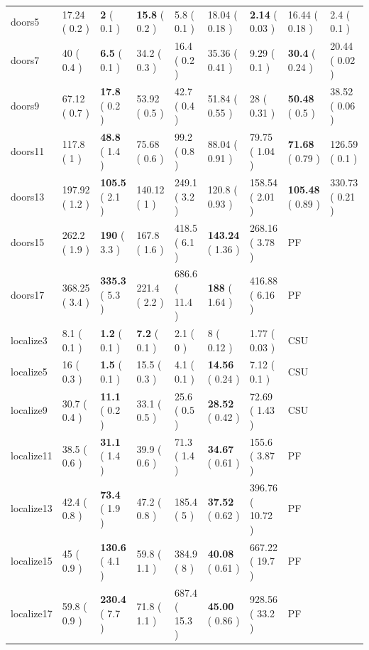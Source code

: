 \documentclass[letterpaper]{article}
\numberwithin{equation}{section}	%
\begin{document}
\begin{table}[htb]
\begin{tabular}{|l||l|l||l|l||l|l||l|l|}
doors5	&	17.24	(	0.2	)&	\textbf{2}	(	0.1	)&			\textbf{15.8}	(	0.2	)&	5.8	(	0.1	)&		18.04	(	0.18	)&	\textbf{2.14}	(	0.03	)&		 16.44	(	0.18	)&	2.4	 (	0.1	)\\
doors7	&	40	(	0.4	)&	\textbf{6.5}	(	0.1	)&			34.2	(	0.3	)&	16.4	(	0.2	)&		35.36	(	0.41	)&	9.29	(	0.1	)&		\textbf{30.4}	 (	0.24	)&	20.44	(	 0.02	)\\
doors9	&	67.12	(	0.7	)&	\textbf{17.8}	(	0.2	)&			53.92	(	0.5	)&	42.7	(	0.4	)&		51.84	(	0.55	)&	28	(	0.31	)&		 \textbf{50.48}	(	0.5	)&	38.52	(	 0.06	)\\
doors11	&	117.8	(	1	)&	\textbf{48.8}	(	1.4	)&			75.68	(	0.6	)&	99.2	(	0.8	)&		88.04	(	0.91	)&	79.75	(	1.04	)&		 \textbf{71.68}	(	0.79	)&	 126.59	(	0.1	)\\
doors13	&	197.92	(	1.2	)&	\textbf{105.5}	(	2.1	)&			140.12	(	1	)&	249.1	(	3.2	)&		120.8	(	0.93	)&	158.54	(	2.01	)&		 \textbf{105.48}	(	0.89	)&	 330.73	(	0.21	 )\\
doors15	&	262.2	(	1.9	)&	\textbf{190}	(	3.3	)&			167.8	(	1.6	)&	418.5	(	6.1	)&		\textbf{143.24}	(	1.36	)&	268.16	(	3.78	)&		 PF			&				 \\
doors17	&	368.25	(	3.4	)&	\textbf{335.3}	(	5.3	)&			221.4	(	2.2	)&	686.6	(	11.4	)&		\textbf{188}	(	1.64	)&	416.88	(	6.16	)&		 PF			&				 \\
\hline

localize3	&	8.1	(	0.1	)&	\textbf{1.2}	(	0.1	)&			\textbf{7.2}	(	0.1	)&	2.1	(	0	)&		8	(	0.12	)&	1.77	(	0.03	)&		CSU&	 \\
localize5	&	16	(	0.3	)&	\textbf{1.5}	(	0.1	)&			15.5	(	0.3	)&	4.1	(	0.1	)&		\textbf{14.56}	(	0.24	)&	7.12	(	0.1	)&		CSU&	 \\
localize9	&	30.7	(	0.4	)&	\textbf{11.1}	(	0.2	)&			33.1	(	0.5	)&	25.6	(	0.5	)&		\textbf{28.52}	(	0.42	)&	72.69	(	1.43	)&		 CSU&	\\
localize11	&	38.5	(	0.6	)&	\textbf{31.1}	(	1.4	)&			39.9	(	0.6	)&	71.3	(	1.4	)&		\textbf{34.67}	(	0.61	)&	155.6	(	3.87	)&		 PF			&	\\
localize13	&	42.4	(	0.8	)&	\textbf{73.4}	(	1.9	)&			47.2	(	0.8	)&	185.4	(	5	)&		\textbf{37.52}	(	0.62	)&	396.76	(	10.72	)&		 PF			&		\\
localize15	&	45	(	0.9	)&	\textbf{130.6}	(	4.1	)&			59.8	(	1.1	)&	384.9	(	8	)&		\textbf{40.08}	(	0.61	)&	667.22	(	19.7	)&		 PF			&				 \\
localize17	&	59.8	(	0.9	)&	\textbf{230.4}	(	7.7	)&			71.8	(	1.1	)&	687.4	(	15.3	)&		\textbf{45.00}	(	0.86	)&	928.56	(	33.2	 )&		PF			&				 \\
\hline


\end{tabular}
\end{table}
\end{document}
